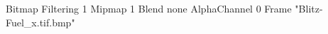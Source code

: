 {Bitmap
	{Filtering 1}
	{Mipmap 1}
	{Blend none}
	{AlphaChannel 0}
	{Frame "Blitz-Fuel_x.tif.bmp"}
}
